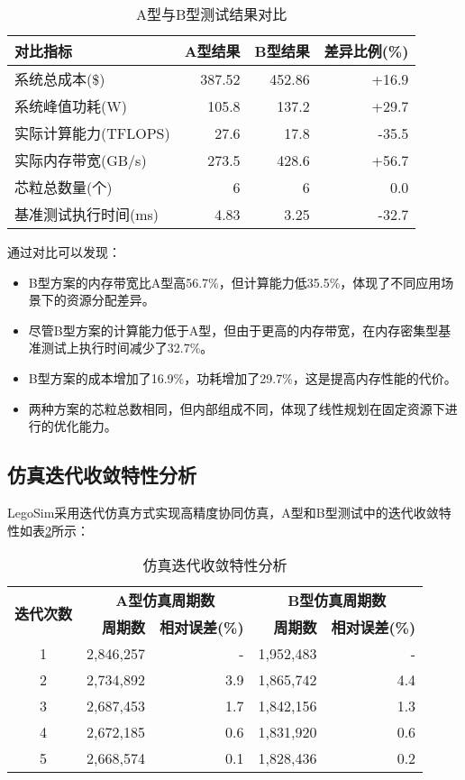 \documentclass[bachelor]{thesis-uestc}
\begin{document}
\begin{table}[htbp]
\caption{A型与B型测试结果对比}
\centering
\begin{tabular}{|l|r|r|r|}
\hline
\textbf{对比指标} & \textbf{A型结果} & \textbf{B型结果} & \textbf{差异比例(\%)} \\
\hline
系统总成本(\$) & 387.52 & 452.86 & +16.9 \\
\hline
系统峰值功耗(W) & 105.8 & 137.2 & +29.7 \\
\hline
实际计算能力(TFLOPS) & 27.6 & 17.8 & -35.5 \\
\hline
实际内存带宽(GB/s) & 273.5 & 428.6 & +56.7 \\
\hline
芯粒总数量(个) & 6 & 6 & 0.0 \\
\hline
基准测试执行时间(ms) & 4.83 & 3.25 & -32.7 \\
\hline
\end{tabular}
\label{tab:comparison_results}
\end{table}

通过对比可以发现：

\begin{itemize}
    \item B型方案的内存带宽比A型高56.7\%，但计算能力低35.5\%，体现了不同应用场景下的资源分配差异。
    \item 尽管B型方案的计算能力低于A型，但由于更高的内存带宽，在内存密集型基准测试上执行时间减少了32.7\%。
    \item B型方案的成本增加了16.9\%，功耗增加了29.7\%，这是提高内存性能的代价。
    \item 两种方案的芯粒总数相同，但内部组成不同，体现了线性规划在固定资源下进行的优化能力。
\end{itemize}

\subsection{仿真迭代收敛特性分析}

LegoSim采用迭代仿真方式实现高精度协同仿真，A型和B型测试中的迭代收敛特性如表\ref{tab:convergence_analysis}所示：

\begin{table}[htbp]
\caption{仿真迭代收敛特性分析}
\centering
\begin{tabular}{|c|r|r|r|r|}
\hline
\multirow{2}{*}{\textbf{迭代次数}} & \multicolumn{2}{c|}{\textbf{A型仿真周期数}} & \multicolumn{2}{c|}{\textbf{B型仿真周期数}} \\
\cline{2-5}
 & \textbf{周期数} & \textbf{相对误差(\%)} & \textbf{周期数} & \textbf{相对误差(\%)} \\
\hline
1 & 2,846,257 & - & 1,952,483 & - \\
\hline
2 & 2,734,892 & 3.9 & 1,865,742 & 4.4 \\
\hline
3 & 2,687,453 & 1.7 & 1,842,156 & 1.3 \\
\hline
4 & 2,672,185 & 0.6 & 1,831,920 & 0.6 \\
\hline
5 & 2,668,574 & 0.1 & 1,828,436 & 0.2 \\
\hline
\end{tabular}
\label{tab:convergence_analysis}
\end{table}
\end{document}
